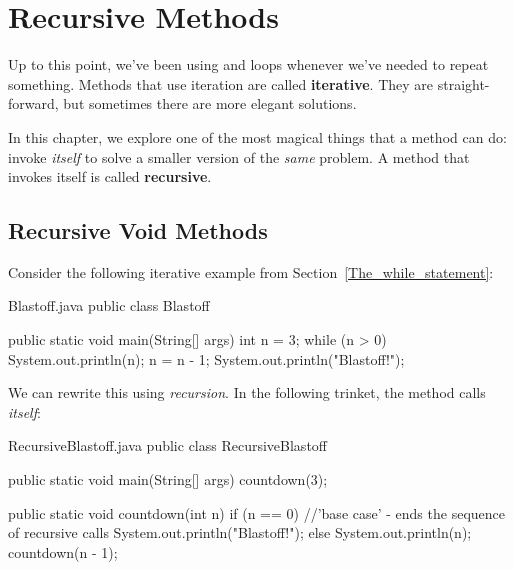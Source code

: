 \chapter{Recursive Methods}


Up to this point, we've been using  and  loops whenever we've needed to repeat something.
Methods that use iteration are called {\bf iterative}.
They are straight-forward, but sometimes there are more elegant solutions.

In this chapter, we explore one of the most magical things that a method can do: invoke {\em itself} to solve a smaller version of the {\em same} problem.
A method that invokes itself is called {\bf recursive}.


\section{Recursive Void Methods}
\label{recursion}

Consider the following iterative example from Section~\ref{The_while_statement}:

\begin{trinket} [230] {Blastoff.java}
public class Blastoff {

    public static void main(String[] args) {
       int n = 3;
       while (n > 0) {
          System.out.println(n);
          n = n - 1;
       }
       System.out.println("Blastoff!");
    }
}
\end{trinket}

We can rewrite this using \emph{recursion}.  In the following trinket, the method  calls \emph{itself}:

\begin{trinket} [280] {RecursiveBlastoff.java}
public class RecursiveBlastoff {

    public static void main(String[] args) {
       countdown(3);
    }
    
    public static void countdown(int n) {
       if (n == 0) {  //'base case' - ends the sequence of recursive calls
           System.out.println("Blastoff!");
       } else {
           System.out.println(n);
           countdown(n - 1);
       }
    }
}
\end{trinket}


